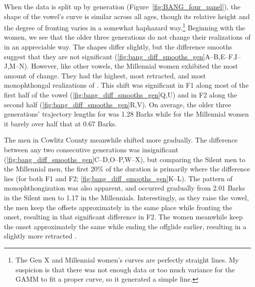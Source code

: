 When the data is split up by generation (Figure~\ref{fig:BANG_four_panel}), the shape of the vowel's curve is similar across all ages, though its relative height and the degree of fronting varies in a somewhat haphazard way.\footnote{The Gen X and Millennial women's curves are perfectly straight lines. My suspicion is that there was not enough data or too much variance for the GAMM to fit a proper curve, so it generated a simple line.} Beginning with the women, we see that the older three generations do not change their realizations of \bang in an appreciable way. The shapes differ slightly, but the difference smooths suggest that they are not significant (\ref{fig:bang_diff_smooths_gen}A--B,E--F,I--J,M--N). However, like other vowels, the Millennial women exhibited the most amount of change. They had the highest, most retracted, and most monophthongal realizations of \bang. This shift was significant in F1 along most of the first half of the vowel (\ref{fig:bang_diff_smooths_gen}Q,U) and in F2 along the second half (\ref{fig:bang_diff_smooths_gen}R,V). On average, the older three generations' trajectory lengths for \bang was 1.28 Barks while for the Millennial women it barely over half that at 0.67 Barks.

The men in Cowlitz County meanwhile shifted \bang more gradually. The difference between any two consecutive generations was insignificant (\ref{fig:bang_diff_smooths_gen}C--D,O--P,W--X), but comparing the Silent men to the Millennial men, the first 20\% of the duration is primarily where the difference lies (for both F1 and F2; \ref{fig:bang_diff_smooths_gen}K--L). The pattern of monophthongization was also apparent, and occurred gradually from 2.01 Barks in the Silent men to 1.17 in the Millennials. Interestingly, as they raise the vowel, the men keep the offsets approximately in the same place while fronting the onset, resulting in that significant difference in F2. The women meanwhile keep the onset approximately the same while ending the offglide earlier, resulting in a slightly more retracted \bang.

